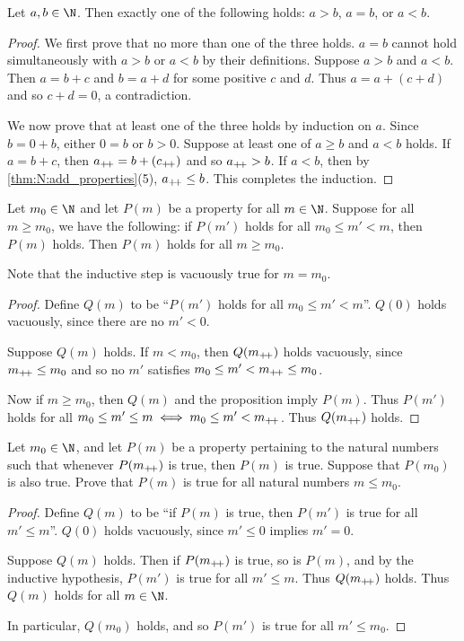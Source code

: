 \begin{proposition}[Trichotomy] \label{thm:trichotomy}
    Let $a, b \in \N$.
    Then exactly one of the following holds: $a > b$, $a = b$, or $a < b$.
\end{proposition}
\begin{proof}
    We first prove that no more than one of the three holds.
    $a = b$ cannot hold simultaneously with $a > b$ or $a < b$ by their
    definitions.
    Suppose $a > b$ and $a < b$.
    Then $a = b + c$ and $b = a + d$ for some positive $c$ and $d$.
    Thus $a = a + (c + d)$ and so $c + d = 0$, a contradiction.

    We now prove that at least one of the three holds by induction on $a$.
    Since $b = 0 + b$, either $0 = b$ or $b > 0$.
    Suppose at least one of $a \ge b$ and $a < b$ holds.
    If $a = b + c$, then $a_{+\!+} = b + (c_{+\!+})$ and so $a_{+\!+} > b$.
    If $a < b$, then by \cref{thm:N:add_properties}(5), $a_{+\!+} \le b$.
    This completes the induction.
\end{proof}

\begin{proposition} \label{thm:strong_induction}
    Let $m_0 \in \N$ and let $P(m)$ be a property for all $m \in \N$.
    Suppose for all $m \ge m_0$, we have the following:
    if $P(m')$ holds for all $m_0 \le m' < m$, then $P(m)$ holds.
    Then $P(m)$ holds for all $m \ge m_0$.
\end{proposition}
Note that the inductive step is vacuously true for $m = m_0$.
\begin{proof}
    Define $Q(m)$ to be ``$P(m')$ holds for all $m_0 \le m' < m$''.
    $Q(0)$ holds vacuously, since there are no $m' < 0$.

    Suppose $Q(m)$ holds.
    If $m < m_0$, then $Q(m_{+\!+})$ holds vacuously, since $m_{+\!+} \le m_0$ and so
    no $m'$ satisfies $m_0 \le m' < m_{+\!+} \le m_0$.

    Now if $m \ge m_0$, then $Q(m)$ and the proposition imply $P(m)$.
    Thus $P(m')$ holds for all $m_0 \le m' \le m \iff m_0 \le m' < m_{+\!+}$.
    Thus $Q(m_{+\!+})$ holds.
\end{proof}

\begin{problem} \label{prb:back_induction}
    Let $m_0 \in \N$, and let $P(m)$ be a property pertaining to the natural
    numbers such that whenever $P(m_{+\!+})$ is true, then $P(m)$ is true.
    Suppose that $P(m_0)$ is also true.
    Prove that $P(m)$ is true for all natural numbers $m \le m_0$.
\end{problem}
\begin{proof}
    Define $Q(m)$ to be ``if $P(m)$ is true, then $P(m')$ is true for all
    $m' \le m$''.
    $Q(0)$ holds vacuously, since $m' \le 0$ implies $m' = 0$.

    Suppose $Q(m)$ holds.
    Then if $P(m_{+\!+})$ is true, so is $P(m)$, and by the inductive hypothesis,
    $P(m')$ is true for all $m' \le m$.
    Thus $Q(m_{+\!+})$ holds.
    Thus $Q(m)$ holds for all $m \in \N$.

    In particular, $Q(m_0)$ holds, and so $P(m')$ is true for all $m' \le m_0$.
\end{proof}

